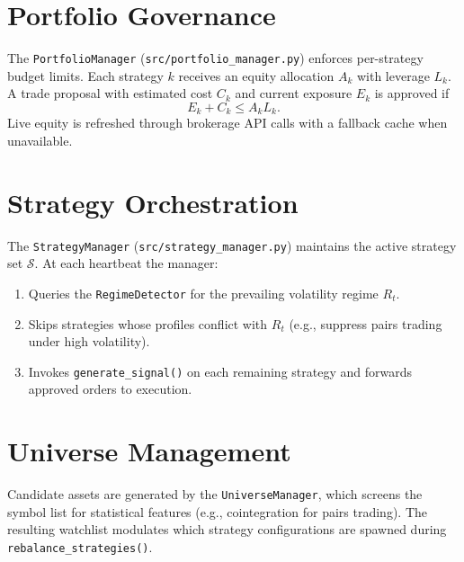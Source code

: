 \section{Portfolio Governance}
The \texttt{PortfolioManager} (\texttt{src/portfolio_manager.py}) enforces per-strategy budget limits. Each strategy $k$ receives an equity allocation $A_k$ with leverage $L_k$. A trade proposal with estimated cost $C_k$ and current exposure $E_k$ is approved if
\begin{equation}
E_k + C_k \leq A_k L_k.
\end{equation}
Live equity is refreshed through brokerage API calls with a fallback cache when unavailable.

\section{Strategy Orchestration}
The \texttt{StrategyManager} (\texttt{src/strategy_manager.py}) maintains the active strategy set $\mathcal{S}$. At each heartbeat the manager:
\begin{enumerate}[label=\arabic*.,noitemsep]
    \item Queries the \texttt{RegimeDetector} for the prevailing volatility regime $R_t$.
    \item Skips strategies whose profiles conflict with $R_t$ (e.g., suppress pairs trading under high volatility).
    \item Invokes \texttt{generate\_signal()} on each remaining strategy and forwards approved orders to execution.
\end{enumerate}

\section{Universe Management}
Candidate assets are generated by the \texttt{UniverseManager}, which screens the symbol list for statistical features (e.g., cointegration for pairs trading). The resulting watchlist modulates which strategy configurations are spawned during \texttt{rebalance\_strategies()}.

